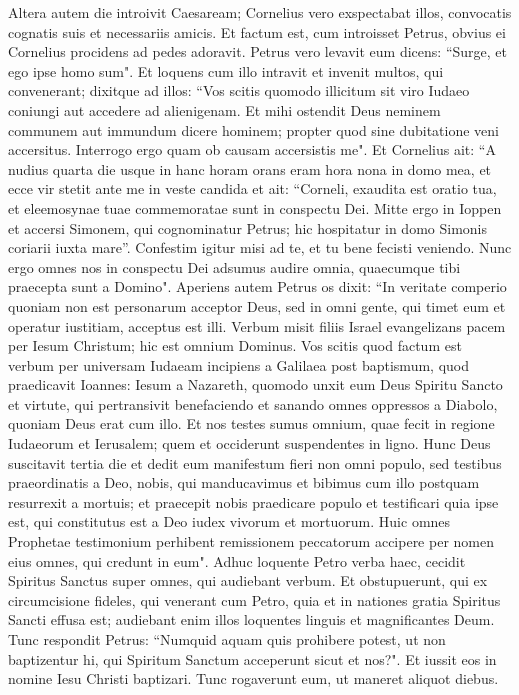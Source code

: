 \begin{biblechapter}
\verse Altera autem die introivit Caesaream; Cornelius vero exspectabat illos, convocatis cognatis suis et necessariis amicis. 
\verse Et factum est, cum introisset Petrus, obvius ei Cornelius procidens ad pedes adoravit. 
\verse Petrus vero levavit eum dicens: “Surge, et ego ipse homo sum". 
\verse Et loquens cum illo intravit et invenit multos, qui convenerant;  
\verse dixitque ad illos: “Vos scitis quomodo illicitum sit viro Iudaeo coniungi aut accedere ad alienigenam. Et mihi ostendit Deus neminem communem aut immundum dicere hominem; 
\verse propter quod sine dubitatione veni accersitus. Interrogo ergo quam ob causam accersistis me". 
\verse Et Cornelius ait: “A nudius quarta die usque in hanc horam orans eram hora nona in domo mea, et ecce vir stetit ante me in veste candida 
\verse et ait: “Corneli, exaudita est oratio tua, et eleemosynae tuae commemoratae sunt in conspectu Dei. 
\verse Mitte ergo in Ioppen et accersi Simonem, qui cognominatur Petrus; hic hospitatur in domo Simonis coriarii iuxta mare”. 
\verse Confestim igitur misi ad te, et tu bene fecisti veniendo. Nunc ergo omnes nos in conspectu Dei adsumus audire omnia, quaecumque tibi praecepta sunt a Domino". 
\verse Aperiens autem Petrus os dixit: “In veritate comperio quoniam non est personarum acceptor Deus, 
\verse sed in omni gente, qui timet eum et operatur iustitiam, acceptus est illi. 
\verse Verbum misit filiis Israel evangelizans pacem per Iesum Christum; hic est omnium Dominus. 
\verse Vos scitis quod factum est verbum per universam Iudaeam incipiens a Galilaea post baptismum, quod praedicavit Ioannes: 
\verse Iesum a Nazareth, quomodo unxit eum Deus Spiritu Sancto et virtute, qui pertransivit benefaciendo et sanando omnes oppressos a Diabolo, quoniam Deus erat cum illo. 
\verse Et nos testes sumus omnium, quae fecit in regione Iudaeorum et Ierusalem; quem et occiderunt suspendentes in ligno. 
\verse Hunc Deus suscitavit tertia die et dedit eum manifestum fieri  
\verse non omni populo, sed testibus praeordinatis a Deo, nobis, qui manducavimus et bibimus cum illo postquam resurrexit a mortuis; 
\verse et praecepit nobis praedicare populo et testificari quia ipse est, qui constitutus est a Deo iudex vivorum et mortuorum. 
\verse Huic omnes Prophetae testimonium perhibent remissionem peccatorum accipere per nomen eius omnes, qui credunt in eum". 
\verse Adhuc loquente Petro verba haec, cecidit Spiritus Sanctus super omnes, qui audiebant verbum. 
\verse Et obstupuerunt, qui ex circumcisione fideles, qui venerant cum Petro, quia et in nationes gratia Spiritus Sancti effusa est;  
\verse audiebant enim illos loquentes linguis et magnificantes Deum. Tunc respondit Petrus: 
\verse “Numquid aquam quis prohibere potest, ut non baptizentur hi, qui Spiritum Sanctum acceperunt sicut et nos?". 
\verse Et iussit eos in nomine Iesu Christi baptizari. Tunc rogaverunt eum, ut maneret aliquot diebus. 
\end{biblechapter}

